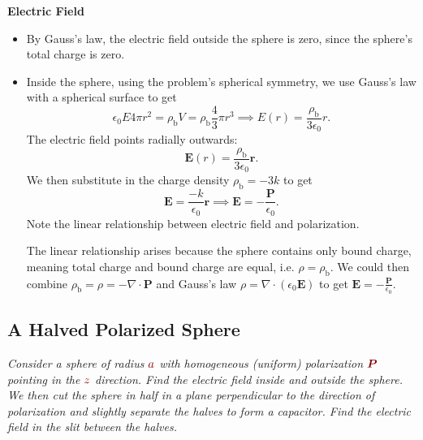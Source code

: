 \documentclass[11pt, a4paper]{article}
\newcommand{\dmath}[1]{\textcolor{Maroon}{#1}}  %
\renewcommand{\vec}[1]{\bm{#1}} %
\renewcommand{\r}{\vec{r}}
\newcommand{\E}{\vec{E}}  %
\newcommand{\ee}{\epsilon_{0}}  %
\renewcommand{\P}{\vec{P}}  %
\renewcommand{\div}{\nabla \cdot}
\begin{document}
\textbf{Electric Field}
\begin{itemize}
	\item By Gauss's law, the electric field outside the sphere is zero, since the sphere's total charge is zero.

	\item Inside the sphere, using the problem's spherical symmetry, we use Gauss's law with a spherical surface to get
	\begin{equation*}
		\ee E 4\pi r^{2} = \rho_{\text{b}} V = \rho_{\text{b}} \frac{4}{3}\pi r^{3} \implies E(r) = \frac{\rho_{\text{b}}}{3 \ee} r.
	\end{equation*} 
	The electric field points radially outwards:
	\begin{equation*}
		\E(r) = \frac{\rho_{\text{b}}}{3 \ee} \r.
	\end{equation*}
	We then substitute in the charge density $ \rho_{\text{b}} = -3k $ to get
	\begin{equation*}
		\E = \frac{-k}{\ee}\r \implies \E = - \frac{\P}{\ee}.
	\end{equation*}
	Note the linear relationship between electric field and polarization.
	
	The linear relationship arises because the sphere contains only bound charge, meaning total charge and bound charge are equal, i.e. $ \rho = \rho_{\text{b}} $. We could then combine $ \rho_{\text{b}} = \rho = - \div \P $ and Gauss's law $ \rho = \div (\ee \E) $ to get  $ \E = - \frac{\P}{\ee} $.
	
\end{itemize}

\subsection{A Halved Polarized Sphere}
\textit{Consider a sphere of radius $ \dmath{a} $ with homogeneous (uniform) polarization $ \dmath{\P} $ pointing in the $ \dmath{z} $ direction. Find the electric field inside and outside the sphere. We then cut the sphere in half in a plane perpendicular to the direction of polarization and slightly separate the halves to form a capacitor. Find the electric field in the slit between the halves.}
\end{document}
